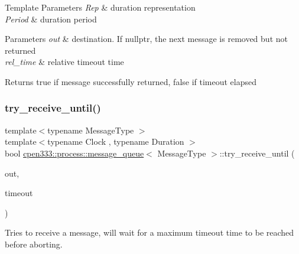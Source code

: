 \begin{DoxyTemplParams}{Template Parameters}
{\em Rep} & duration representation \\
\hline
{\em Period} & duration period \\
\hline
\end{DoxyTemplParams}

\begin{DoxyParams}{Parameters}
{\em out} & destination. If {\ttfamily nullptr}, the next message is removed but not returned \\
\hline
{\em rel\+\_\+time} & relative timeout time \\
\hline
\end{DoxyParams}
\begin{DoxyReturn}{Returns}
{\ttfamily true} if message successfully returned, {\ttfamily false} if timeout elapsed 
\end{DoxyReturn}
\mbox{\label{classcpen333_1_1process_1_1message__queue_abf193426822dfbb27fc1ce972db42da0}} 
\subsubsection{\texorpdfstring{try\+\_\+receive\+\_\+until()}{try\_receive\_until()}}
{\footnotesize\ttfamily template$<$typename Message\+Type $>$ \\
template$<$typename Clock , typename Duration $>$ \\
bool \hyperlink{classcpen333_1_1process_1_1message__queue}{cpen333\+::process\+::message\+\_\+queue}$<$ Message\+Type $>$\+::try\+\_\+receive\+\_\+until (\begin{DoxyParamCaption}\item[{Message\+Type $\ast$}]{out,  }\item[{const std\+::chrono\+::time\+\_\+point$<$ Clock, Duration $>$ \&}]{timeout }\end{DoxyParamCaption})\hspace{0.3cm}{\ttfamily [inline]}}



Tries to receive a message, will wait for a maximum timeout time to be reached before aborting. 

